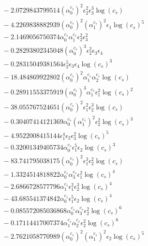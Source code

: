 \documentclass[10pt]{article}
\begin{document}
\begin{align*}
&{}  - 2.0729843799514 \left(\alpha_{0}^{c_s}\right)^{2} \epsilon_{2}^{2} \epsilon_{3}^{3} \log{\left(c_{s} \right)} \\
&{}  - 4.2269838882939 \left(\alpha_{0}^{c_s}\right)^{2} \left(\alpha_{1}^{c_s}\right)^{2} \epsilon_{1} \log{\left(c_{s} \right)}^{5} \\
&{}  - 2.1469056750374 \alpha_{0}^{c_s} \alpha_{1}^{c_s} \epsilon_{2}^{2} \epsilon_{3}^{2} \\
&{}  - 0.28293802345048 \left(\alpha_{0}^{c_s}\right)^{3} \epsilon_{2}^{2} \epsilon_{3} \epsilon_{4} \\
&{}  - 0.28315049381564 \epsilon_{2}^{5} \epsilon_{3} \epsilon_{4} \log{\left(c_{s} \right)}^{3} \\
&{}  - 18.484869922802 \left(\alpha_{0}^{c_s}\right)^{2} \alpha_{1}^{c_s} \alpha_{2}^{c_s} \log{\left(c_{s} \right)} \\
&{}  - 0.28911553375919 \left(\alpha_{0}^{c_s}\right)^{3} \alpha_{1}^{c_s} \epsilon_{1}^{2} \log{\left(c_{s} \right)}^{2} \\
&{}  - 38.055767524651 \left(\alpha_{0}^{c_s}\right)^{2} \epsilon_{1}^{2} \epsilon_{2}^{3} \log{\left(c_{s} \right)} \\
&{}  - 0.30407414121369 \alpha_{0}^{c_s} \left(\alpha_{1}^{c_s}\right)^{2} \epsilon_{2}^{2} \log{\left(c_{s} \right)}^{3} \\
&{}  - 4.9522008415144 \epsilon_{1}^{4} \epsilon_{2} \epsilon_{3}^{2} \log{\left(c_{s} \right)}^{5} \\
&{}  - 0.32001349405734 \alpha_{0}^{c_s} \epsilon_{1}^{5} \epsilon_{2} \log{\left(c_{s} \right)}^{3} \\
&{}  - 83.741795038175 \left(\alpha_{0}^{c_s}\right)^{2} \epsilon_{1}^{3} \epsilon_{2}^{2} \log{\left(c_{s} \right)} \\
&{}  - 1.3324514818822 \alpha_{0}^{c_s} \alpha_{3}^{c_s} \epsilon_{1}^{2} \log{\left(c_{s} \right)}^{4} \\
&{}  - 2.6866728577796 \alpha_{1}^{c_s} \epsilon_{1}^{2} \epsilon_{2}^{3} \log{\left(c_{s} \right)}^{4} \\
&{}  - 43.685541374842 \alpha_{0}^{c_s} \epsilon_{1}^{5} \epsilon_{2} \log{\left(c_{s} \right)}^{4} \\
&{}  - 0.085572085036868 \alpha_{0}^{c_s} \alpha_{3}^{c_s} \epsilon_{2}^{2} \log{\left(c_{s} \right)}^{6} \\
&{}  - 0.17114417007374 \alpha_{1}^{c_s} \alpha_{2}^{c_s} \epsilon_{2}^{2} \log{\left(c_{s} \right)}^{6} \\
&{}  - 2.7621058770989 \left(\alpha_{0}^{c_s}\right)^{2} \left(\alpha_{1}^{c_s}\right)^{2} \epsilon_{2} \log{\left(c_{s} \right)}^{5} \\

\end{align*}
\end{document}
